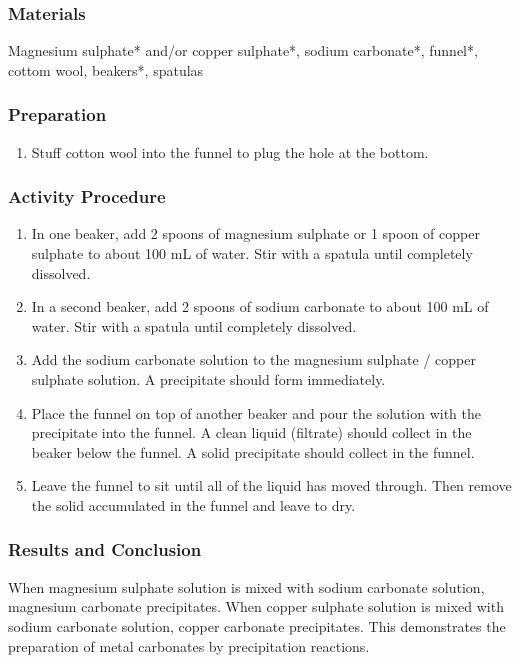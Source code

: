 \subsubsection*{Materials}
Magnesium sulphate* and/or copper sulphate*, sodium carbonate*, funnel*, cottom wool, beakers*, spatulas

\subsubsection*{Preparation}
\begin{enumerate}
\item{Stuff cotton wool into the funnel to plug the hole at the bottom.}
\end{enumerate}

\subsubsection*{Activity Procedure}
\begin{enumerate}
\item{In one beaker, add 2 spoons of magnesium sulphate or 1 spoon of copper sulphate to about 100 mL of water. Stir with a spatula until completely dissolved.}
\item{In a second beaker, add 2 spoons of sodium carbonate to about 100 mL of water. Stir with a spatula until completely dissolved.}
\item{Add the sodium carbonate solution to the magnesium sulphate / copper sulphate solution. A precipitate should form immediately.}
\item{Place the funnel on top of another beaker and pour the solution with the precipitate into the funnel. A clean liquid (filtrate) should collect in the beaker below the funnel. A solid precipitate should collect in the funnel.}
\item{Leave the funnel to sit until all of the liquid has moved through. Then remove the solid accumulated in the funnel and leave to dry.}
\end{enumerate}

\subsubsection*{Results and Conclusion}
When magnesium sulphate solution is mixed with sodium carbonate solution, magnesium carbonate precipitates. When copper sulphate solution is mixed with sodium carbonate solution, copper carbonate precipitates. This demonstrates the preparation of metal carbonates by precipitation reactions.

